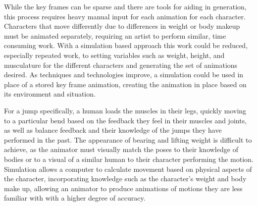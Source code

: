 While the key frames can be sparse and there are tools for aiding in generation, this process requires heavy manual input for each animation for each character.  Characters that move differently due to differences in weight or body makeup must be animated separately, requiring an artist to perform similar, time consuming work.  With a simulation based approach this work could be reduced, especially repeated work, to setting variables such as weight, height, and musculature for the different characters and generating the set of animations desired.  As techniques and technologies improve, a simulation could be used in place of a stored key frame animation, creating the animation in place based on its environment and situation.

For a jump specifically, a human loads the muscles in their legs, quickly moving to a particular bend based on the feedback they feel in their muscles and joints, as well as balance feedback and their knowledge of the jumps they have performed in the past.  The appearance of bearing and lifting weight is difficult to achieve, as the animator must visually match the poses to their knowledge of bodies or to a visual of a similar human to their character performing the motion.  Simulation allows a computer to calculate movement based on physical aspects of the character, incorporating knowledge such as the character's weight and body make up, allowing an animator to produce animations of motions they are less familiar with with a higher degree of accuracy.


